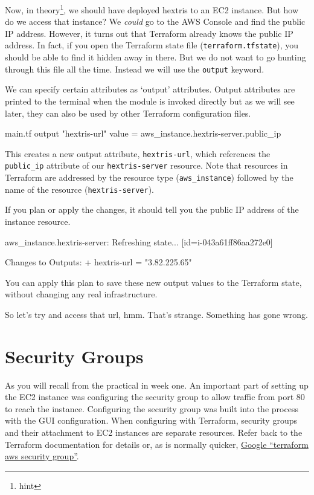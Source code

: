 \documentclass{csse4400}
\begin{document}
Now, in theory\footnote{hint}, we should have deployed hextris to an EC2 instance.
But how do we access that instance?
We \textsl{could} go to the AWS Console and find the public IP address.
However, it turns out that Terraform already knows the public IP address.
In fact, if you open the Terraform state file (\texttt{terraform.tfstate}),
you should be able to find it hidden away in there.
But we do not want to go hunting through this file all the time.
Instead we will use the \texttt{output} keyword.

We can specify certain attributes as `output' attributes.
Output attributes are printed to the terminal when the module is invoked directly
but as we will see later, they can also be used by other Terraform configuration files.

\begin{code}[language=terraform]{main.tf}
output "hextris-url" {
  value = aws_instance.hextris-server.public_ip
}
\end{code}

This creates a new output attribute, \texttt{hextris-url},
which references the \texttt{public\_ip} attribute of our \texttt{hextris-server} resource.
Note that resources in Terraform are addressed by the resource type (\texttt{aws\_instance})
followed by the name of the resource (\texttt{hextris-server}).

If you plan or apply the changes, it should tell you the public IP address of the instance resource.

\begin{code}[language=terraform-plan]{}
aws_instance.hextris-server: Refreshing state... [id=i-043a61ff86aa272e0]

Changes to Outputs:
  + hextris-url = "3.82.225.65"
\end{code}

You can apply this plan to save these new output values to the Terraform state, without changing any real infrastructure.  

So let's try and access that url, hmm.
That's strange. Something has gone wrong.

\section{Security Groups}
As you will recall from the practical in week one.
An important part of setting up the EC2 instance was configuring the security group to allow traffic from port 80 to reach the instance.
Configuring the security group was built into the process with the GUI configuration.
When configuring with Terraform, security groups and their attachment to EC2 instances are separate resources.
Refer back to the Terraform documentation for details or,
as is normally quicker, \href{https://www.google.com/search?q=terraform+aws+security+group}{Google ``terraform aws security group''}.
\end{document}
